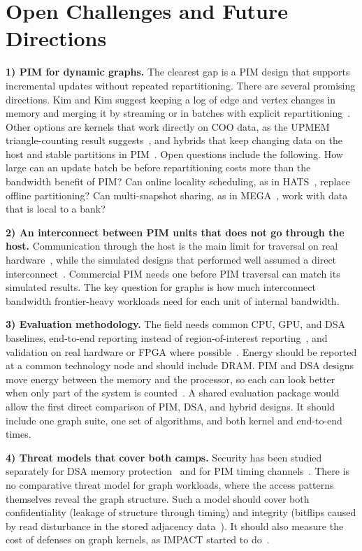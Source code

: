 \documentclass[journal,onecolumn]{IEEEtran}
\begin{document}
\section{Open Challenges and Future Directions}\label{sec:open}
\textbf{1) PIM for dynamic graphs.} The clearest gap is a PIM design that supports incremental updates without repeated repartitioning. There are several promising directions. Kim and Kim suggest keeping a log of edge and vertex changes in memory and merging it by streaming or in batches with explicit repartitioning~\cite{kim2020dynamic}. Other options are kernels that work directly on COO data, as the UPMEM triangle-counting result suggests~\cite{asquini2025tc}, and hybrids that keep changing data on the host and stable partitions in PIM~\cite{shin2025fala}. Open questions include the following. How large can an update batch be before repartitioning costs more than the bandwidth benefit of PIM? Can online locality scheduling, as in HATS~\cite{mukkara2018hats}, replace offline partitioning? Can multi-snapshot sharing, as in MEGA~\cite{gao2023mega}, work with data that is local to a bank?

\textbf{2) An interconnect between PIM units that does not go through the host.} Communication through the host is the main limit for traversal on real hardware~\cite{gomezluna2022prim,barkhordar2025alphapim}, while the simulated designs that performed well assumed a direct interconnect~\cite{ahn2015tesseract,zhuo2019graphq}. Commercial PIM needs one before PIM traversal can match its simulated results. The key question for graphs is how much interconnect bandwidth frontier-heavy workloads need for each unit of internal bandwidth.

\textbf{3) Evaluation methodology.} The field needs common CPU, GPU, and DSA baselines, end-to-end reporting instead of region-of-interest reporting~\cite{yenimol2026cograf}, and validation on real hardware or FPGA where possible~\cite{shin2025piccolo,chen2022regraph}. Energy should be reported at a common technology node and should include DRAM. PIM and DSA designs move energy between the memory and the processor, so each can look better when only part of the system is counted~\cite{yenimol2026cograf,ham2016graphicionado}. A shared evaluation package would allow the first direct comparison of PIM, DSA, and hybrid designs. It should include one graph suite, one set of algorithms, and both kernel and end-to-end times.

\textbf{4) Threat models that cover both camps.} Security has been studied separately for DSA memory protection~\cite{hua2022mgx} and for PIM timing channels~\cite{bostanci2025impact}. There is no comparative threat model for graph workloads, where the access patterns themselves reveal the graph structure. Such a model should cover both confidentiality (leakage of structure through timing) and integrity (bitflips caused by read disturbance in the stored adjacency data~\cite{yuksel2026pid}). It should also measure the cost of defenses on graph kernels, as IMPACT started to do~\cite{bostanci2025impact}.
\end{document}
